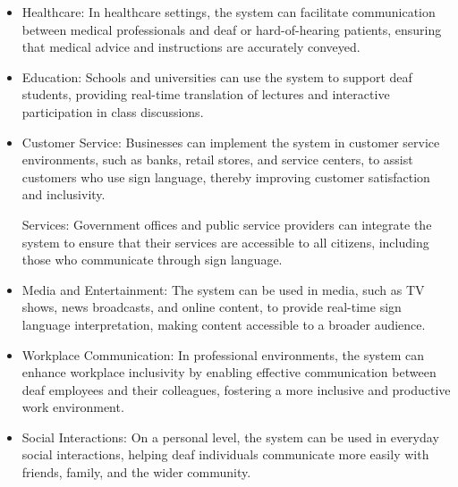 \begin{itemize}
    \item Healthcare:
   In healthcare settings, the system can facilitate communication between medical professionals and deaf or hard-of-hearing patients, ensuring that medical advice and instructions are accurately conveyed.


    \item Education:
   Schools and universities can use the system to support deaf students, providing real-time translation of lectures and interactive participation in class discussions.


    \item  Customer Service:
   Businesses can implement the system in customer service environments, such as banks, retail stores, and service centers, to assist customers who use sign language, thereby improving customer satisfaction and inclusivity.



    \itemPublic Services:
   Government offices and public service providers can integrate the system to ensure that their services are accessible to all citizens, including those who communicate through sign language.

   \item Media and Entertainment:
   The system can be used in media, such as TV shows, news broadcasts, and online content, to provide real-time sign language interpretation, making content accessible to a broader audience.


   \item Workplace Communication:
   In professional environments, the system can enhance workplace inclusivity by enabling effective communication between deaf employees and their colleagues, fostering a more inclusive and productive work environment.

   \item Social Interactions:
   On a personal level, the system can be used in everyday social interactions, helping deaf individuals communicate more easily with friends, family, and the wider community.



    \end{itemize}
